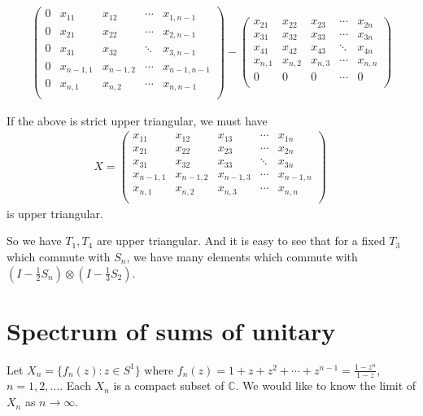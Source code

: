 \documentclass[a4paper,10pt]{amsart}
\newcommand{\C}{\mathbb C} %
\begin{document}
\begin{align*}
\begin{pmatrix}
       0 & x_{11} & x_{12} & \cdots & x_{1,n-1} \\
       0 & x_{21} & x_{22} & \cdots & x_{2,n-1}\\
       0 & x_{31} & x_{32} & \ddots & x_{3,n-1} \\
       0 &  x_{n-1,1} &  x_{n-1,2} & \cdots & x_{n-1,n-1}  \\
       0  & x_{n,1}  & x_{n,2}  & \cdots & x_{n,n-1}   \\
    \end{pmatrix} -  
    \begin{pmatrix} 
       x_{21} & x_{22} & x_{23} & \cdots & x_{2n} \\
       x_{31} & x_{32} & x_{33} & \cdots & x_{3n}\\
       x_{41} & x_{42} & x_{43} & \ddots & x_{4n} \\
       x_{n,1} &  x_{n,2} &  x_{n,3} & \cdots & x_{n,n}  \\
       0  & 0  & 0  & \cdots & 0   \\
    \end{pmatrix}
\end{align*}

If the above is strict upper triangular, we must have 
\begin{align*}
    X= \begin{pmatrix} 
       x_{11} & x_{12} & x_{13} & \cdots & x_{1n} \\
       x_{21} & x_{22} & x_{23} & \cdots & x_{2n}\\
       x_{31} & x_{32} & x_{33} & \ddots & x_{3n} \\
       x_{n-1,1} &  x_{n-1,2} &  x_{n-1,3} & \cdots & x_{n-1,n}  \\
       x_{n,1}  & x_{n,2}  & x_{n,3}  & \cdots & x_{n,n}   \\
    \end{pmatrix}\
\end{align*}
is upper triangular.

So we have $T_1, T_4$ are upper triangular.
And it is easy to see that for a fixed $T_3$ which commute with $S_n$, we have many
elements which commute with $(I-\frac{1}{2}S_n) \otimes (I- \frac{1}{3}S_2)$.
 
\section{Spectrum of sums of unitary}

Let $X_{n} = \{f_n(z) : z \in S^{1} \}$ where
$f_n(z) = 1 + z + z^2 + \cdots + z^{n-1} = \frac{1-z^{n}}{1-z}$, 
$n = 1, 2, \ldots$. Each $X_n$ is a compact subset of $\C$. We would like 
to know the limit of $X_n$ as $n \to \infty$.
\end{document}
